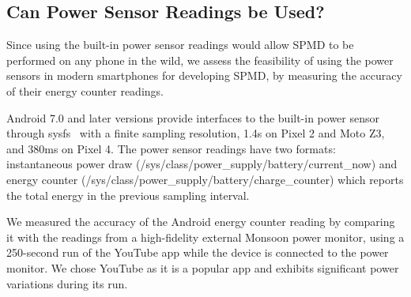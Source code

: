 \subsection{Can Power Sensor Readings be Used?}
\label{subsec:modelling_sensor}

Since using the built-in power sensor readings would allow SPMD to be
performed on any phone in the wild, we assess the feasibility of using
the power sensors in modern smartphones for developing SPMD, by
measuring the accuracy of their energy counter readings.

\begin{sloppy}
Android 7.0 and later versions provide 
interfaces to the built-in power sensor through sysfs~\cite{linuxsysfs} with
a finite sampling resolution, 1.4s on Pixel 2 and Moto Z3, and 380ms on Pixel 4.
{The power sensor readings have two formats}: instantaneous power draw 
({\small /sys/\-class/\-power\_supply/\-battery/\-current\_now}) and
energy counter ({\small /sys/\-class/\-power\_supply/\-battery/\-charge\_counter})
which reports the total energy in the previous sampling interval.
\end{sloppy}

We measured the accuracy of the Android energy counter reading by
comparing it with the readings from a
high-fidelity external Monsoon power monitor,
using a 250-second run of the YouTube app while the device is
connected to the power monitor.  We chose YouTube as it is a popular
app and exhibits significant power variations during its run.

